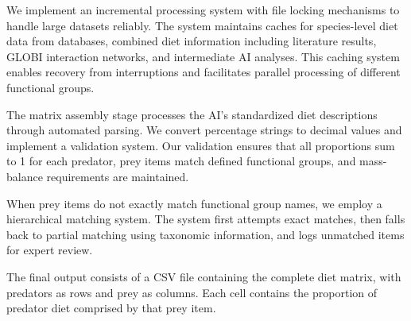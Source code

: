 We implement an incremental processing system with file locking mechanisms to handle large datasets reliably. The system maintains caches for species-level diet data from databases, combined diet information including literature results, GLOBI interaction networks, and intermediate AI analyses. This caching system enables recovery from interruptions and facilitates parallel processing of different functional groups.

The matrix assembly stage processes the AI's standardized diet descriptions through automated parsing. We convert percentage strings to decimal values and implement a validation system. Our validation ensures that all proportions sum to 1 for each predator, prey items match defined functional groups, and mass-balance requirements are maintained.

When prey items do not exactly match functional group names, we employ a hierarchical matching system. The system first attempts exact matches, then falls back to partial matching using taxonomic information, and logs unmatched items for expert review.

The final output consists of a CSV file containing the complete diet matrix, with predators as rows and prey as columns. Each cell contains the proportion of predator diet comprised by that prey item.
